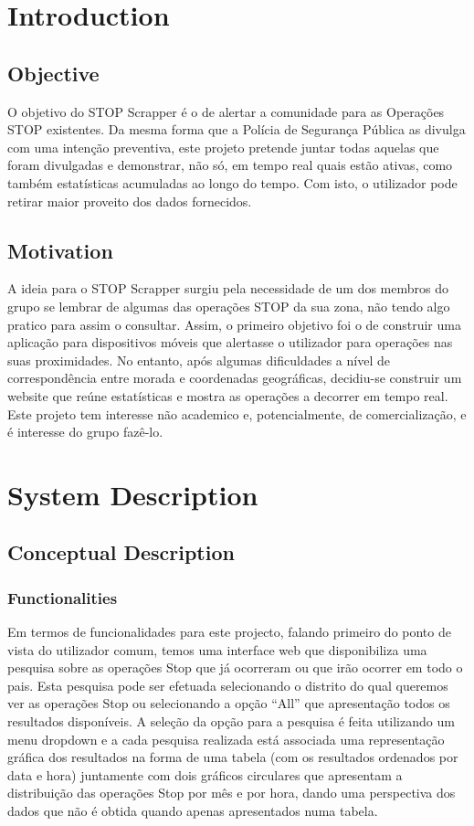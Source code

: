 \documentclass[12pt]{article}
\begin{document}
\newpage


\section{Introduction}
\subsection{Objective}
O objetivo do STOP Scrapper é o de alertar a comunidade para as Operações STOP existentes. Da mesma forma que a Polícia de Segurança Pública as divulga com uma intenção preventiva, este projeto pretende juntar todas aquelas que foram divulgadas e demonstrar, não só, em tempo real quais estão ativas, como também estatísticas acumuladas ao longo do tempo. Com isto, o utilizador pode retirar maior proveito dos dados fornecidos.

\subsection{Motivation}
A ideia para o STOP Scrapper surgiu pela necessidade de um dos membros do grupo se lembrar de algumas das operações STOP da sua zona, não tendo algo pratico para assim o consultar. Assim, o primeiro objetivo foi o de construir uma aplicação para dispositivos móveis que alertasse o utilizador para operações nas suas proximidades. No entanto, após algumas dificuldades a nível de correspondência entre morada e coordenadas geográficas, decidiu-se construir um website que reúne estatísticas e mostra as operações a decorrer em tempo real. Este projeto tem interesse não academico e, potencialmente, de comercialização, e é interesse do grupo fazê-lo.
\newpage
\section{System Description}
\subsection{Conceptual Description}
\subsubsection{Functionalities}
Em termos de funcionalidades para este projecto, falando primeiro do ponto de vista do utilizador comum, temos uma interface web que disponibiliza uma pesquisa sobre as operações Stop que já ocorreram ou que irão ocorrer em todo o pais. Esta pesquisa pode ser efetuada selecionando o distrito do qual queremos ver as operações Stop ou selecionando a opção “All” que apresentação todos os resultados disponíveis. A seleção da opção para a pesquisa é feita utilizando um menu dropdown e a cada pesquisa realizada está associada uma representação gráfica dos resultados na forma de uma tabela (com os resultados ordenados por data e hora) juntamente com dois gráficos circulares que apresentam a distribuição das operações Stop por mês e por hora, dando uma perspectiva dos dados que não é obtida quando apenas apresentados numa tabela.\\
\end{document}
